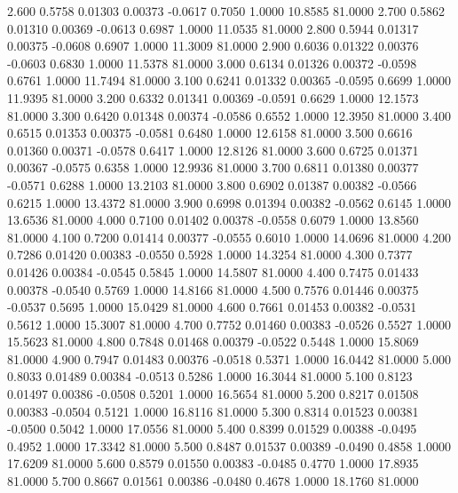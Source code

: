    2.600   0.5758   0.01303   0.00373  -0.0617   0.7050   1.0000  10.8585  81.0000
   2.700   0.5862   0.01310   0.00369  -0.0613   0.6987   1.0000  11.0535  81.0000
   2.800   0.5944   0.01317   0.00375  -0.0608   0.6907   1.0000  11.3009  81.0000
   2.900   0.6036   0.01322   0.00376  -0.0603   0.6830   1.0000  11.5378  81.0000
   3.000   0.6134   0.01326   0.00372  -0.0598   0.6761   1.0000  11.7494  81.0000
   3.100   0.6241   0.01332   0.00365  -0.0595   0.6699   1.0000  11.9395  81.0000
   3.200   0.6332   0.01341   0.00369  -0.0591   0.6629   1.0000  12.1573  81.0000
   3.300   0.6420   0.01348   0.00374  -0.0586   0.6552   1.0000  12.3950  81.0000
   3.400   0.6515   0.01353   0.00375  -0.0581   0.6480   1.0000  12.6158  81.0000
   3.500   0.6616   0.01360   0.00371  -0.0578   0.6417   1.0000  12.8126  81.0000
   3.600   0.6725   0.01371   0.00367  -0.0575   0.6358   1.0000  12.9936  81.0000
   3.700   0.6811   0.01380   0.00377  -0.0571   0.6288   1.0000  13.2103  81.0000
   3.800   0.6902   0.01387   0.00382  -0.0566   0.6215   1.0000  13.4372  81.0000
   3.900   0.6998   0.01394   0.00382  -0.0562   0.6145   1.0000  13.6536  81.0000
   4.000   0.7100   0.01402   0.00378  -0.0558   0.6079   1.0000  13.8560  81.0000
   4.100   0.7200   0.01414   0.00377  -0.0555   0.6010   1.0000  14.0696  81.0000
   4.200   0.7286   0.01420   0.00383  -0.0550   0.5928   1.0000  14.3254  81.0000
   4.300   0.7377   0.01426   0.00384  -0.0545   0.5845   1.0000  14.5807  81.0000
   4.400   0.7475   0.01433   0.00378  -0.0540   0.5769   1.0000  14.8166  81.0000
   4.500   0.7576   0.01446   0.00375  -0.0537   0.5695   1.0000  15.0429  81.0000
   4.600   0.7661   0.01453   0.00382  -0.0531   0.5612   1.0000  15.3007  81.0000
   4.700   0.7752   0.01460   0.00383  -0.0526   0.5527   1.0000  15.5623  81.0000
   4.800   0.7848   0.01468   0.00379  -0.0522   0.5448   1.0000  15.8069  81.0000
   4.900   0.7947   0.01483   0.00376  -0.0518   0.5371   1.0000  16.0442  81.0000
   5.000   0.8033   0.01489   0.00384  -0.0513   0.5286   1.0000  16.3044  81.0000
   5.100   0.8123   0.01497   0.00386  -0.0508   0.5201   1.0000  16.5654  81.0000
   5.200   0.8217   0.01508   0.00383  -0.0504   0.5121   1.0000  16.8116  81.0000
   5.300   0.8314   0.01523   0.00381  -0.0500   0.5042   1.0000  17.0556  81.0000
   5.400   0.8399   0.01529   0.00388  -0.0495   0.4952   1.0000  17.3342  81.0000
   5.500   0.8487   0.01537   0.00389  -0.0490   0.4858   1.0000  17.6209  81.0000
   5.600   0.8579   0.01550   0.00383  -0.0485   0.4770   1.0000  17.8935  81.0000
   5.700   0.8667   0.01561   0.00386  -0.0480   0.4678   1.0000  18.1760  81.0000
